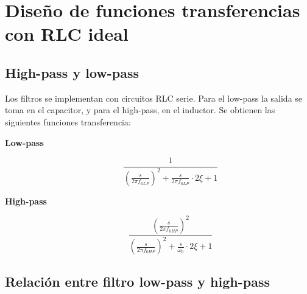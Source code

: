 \section{Dise\~no de funciones transferencias con RLC ideal}




\subsection{High-pass y low-pass}

Los filtros se implementan con circuitos RLC serie. Para el low-pass la salida se toma en el capacitor, y para el high-pass, en el inductor. Se obtienen las siguientes funciones transferencia:\\

\begin{description}%
	
	\item[\textbf{Low-pass}]
	
	\begin{equation}
	\frac{1}{\left(\frac{s}{2\pi f_{0LP}}\right)^2 + \frac{s}{2\pi f_{0LP}} \cdot 2\xi + 1}
	\label{eq:ej2_LP_tf_syms}
	\end{equation}	
	
	\item[\textbf{High-pass}]
	
	\begin{equation}
	\frac{\left(\frac{s}{2\pi f_{0HP}}\right)^2}{\left(\frac{s}{2\pi f_{0HP}}\right)^2 + \frac{s}{\omega _0}\cdot 2 \xi + 1}
	\label{eq:ej2_HP_tf_syms}
	\end{equation}

\end{description}


\subsection{Relaci\'on entre filtro low-pass y high-pass}


